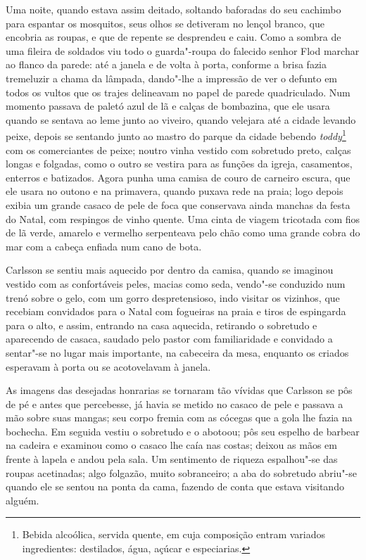 Uma noite, quando estava assim deitado, soltando baforadas do seu
cachimbo para espantar os mosquitos, seus olhos se detiveram no lençol
branco, que encobria as roupas, e que de repente se desprendeu e caiu. Como a
sombra de uma fileira de soldados viu todo o guarda"-roupa do falecido
senhor Flod marchar ao flanco da parede: até a janela 
e de volta à porta, conforme a brisa fazia
tremeluzir a chama da lâmpada, dando"-lhe a impressão de ver o defunto em todos
os vultos que os trajes delineavam no papel de parede quadriculado. Num momento passava
de paletó azul de lã e calças de bombazina, que ele usara quando se sentava ao
leme junto ao viveiro, quando velejara até a cidade levando peixe, depois se
sentando junto ao mastro do parque da cidade bebendo \textit{toddy}\footnote{ Bebida alcoólica, servida quente, 
em cuja composição entram variados ingredientes: destilados, água, açúcar e especiarias.} 
com os comerciantes de peixe; noutro vinha vestido com sobretudo preto, calças longas e
folgadas, como o outro se vestira para as funções da igreja, casamentos,
enterros e batizados. Agora punha uma camisa de couro de carneiro escura,
que ele usara no outono e na primavera, quando puxava rede na praia; logo depois 
exibia um grande casaco de pele de foca que conservava ainda manchas da festa
do Natal, com respingos de vinho quente. Uma cinta de viagem tricotada com
fios de lã verde, amarelo e vermelho serpenteava pelo chão como uma grande cobra
do mar com a cabeça enfiada num cano de bota.

Carlsson se sentiu mais aquecido por dentro da camisa, quando se imaginou
vestido com as confortáveis peles, macias como seda, vendo"-se conduzido num
trenó sobre o gelo, com um gorro despretensioso, indo visitar os vizinhos, que
recebiam convidados para o Natal com fogueiras na praia e tiros de espingarda
para o alto, e assim, entrando na casa aquecida, retirando o sobretudo e
aparecendo de casaca, saudado pelo pastor com familiaridade e convidado a
sentar"-se no lugar mais importante, na cabeceira da mesa, enquanto os criados
esperavam à porta ou se acotovelavam à janela.

As imagens das desejadas honrarias se tornaram tão vívidas que Carlsson se pôs
de pé e antes que percebesse, já havia se metido no casaco de pele e passava a
mão sobre suas mangas; seu corpo fremia com as cócegas que a gola lhe fazia na
bochecha. Em seguida vestiu o sobretudo e o abotoou; pôs seu espelho de barbear
na cadeira e examinou como o casaco lhe caía nas costas; deixou as mãos em
frente à lapela e andou pela sala. Um sentimento de riqueza espalhou"-se das
roupas acetinadas; algo folgazão, muito sobranceiro; a aba do sobretudo abriu"-se
quando ele se sentou na ponta da cama, fazendo de conta que estava visitando
alguém.

